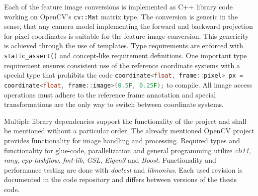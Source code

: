 Each of the feature image conversions is implemented as C++ library code working on OpenCV's\cite{opencv_library} \lstinline[basicstyle=\ttfamily]|cv::Mat| matrix type.
The conversion is generic in the sense, that any camera model implementing the forward and backward projection for pixel coordinates is suitable for the feature image conversion.
This genericity is achieved through the use of templates.
Type requirements are enforced with \lstinline[basicstyle=\ttfamily]|static_assert()| and concept-like\cite{c++concepts} requirement definitions.
One important type requirement ensures consistent use of the reference coordinate systems with a special type that prohibits the code \texttt{\lstinline[language=C++,basicstyle=\footnotesize\ttfamily]|coordinate<float, frame::pixel> px = coordinate<float, frame::image>(0.5F, 0.25F);|} to compile.
All image access operations must adhere to the reference frame annotation and special transformations are the only way to switch between coordinate systems.

Multiple library dependencies support the functionality of the project and shall be mentioned without a particular order.
The already mentioned OpenCV\cite{opencv_library} project provides functionality for image handling and processing. 
Required types and functionality for glue-code, parallelization and general programming utilize \emph{cli11}\cite{cli11}, \emph{rang}\cite{rang}, \emph{cpp-taskflow}\cite{Huang2019CppTaskflowFT}, \emph{fmt-lib}\cite{fmtlib}, \emph{GSL}\cite{gsl}, \emph{Eigen3}\cite{eigenweb} and \emph{Boost}\cite{boost}.
Functionality and performance testing are done with \emph{doctest}\cite{doctest} and \emph{libnonius}\cite{libnonius}.
Each used revision is documented in the code repository and differs between versions of the thesis code.
